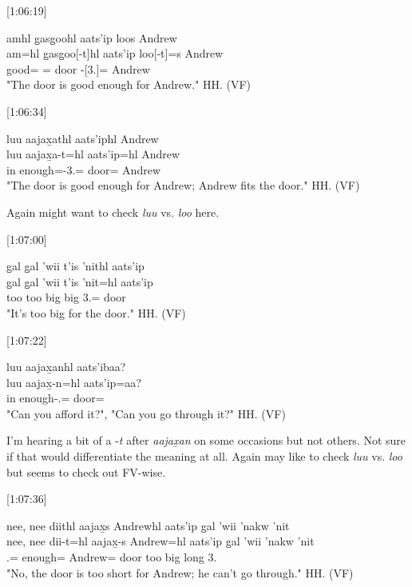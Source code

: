 [1:06:19]
\begin{exe}
    \ex \glll
    amhl g̱asg̱oohl aats'ip loos Andrew \\
    am=hl g̱asg̱oo[-t]hl aats'ip loo[-t]=s Andrew \\
    good=\Cn{} \Mass[-3.\Ii]=\Cn{} door \Obl-[3.\Ii]=\Pn{} Andrew \\
    \glt "The door is good enough for Andrew." \hfill HH.\ElicitationDate{} (VF)
\end{exe}

[1:06:34]
\begin{exe}
    \ex \glll
    luu aajax̱athl aats'iphl Andrew \\
    luu aajax̱a-t=hl aats'ip=hl Andrew  \\
    in enough=-3.\Ii=\Cn{} door=\Cn{} Andrew \\
    \glt "The door is good enough for Andrew; Andrew fits the door." \hfill HH.\ElicitationDate{} (VF)
\end{exe}

Again might want to check \textit{luu} vs. \textit{loo} here.

[1:07:00]
\begin{exe}
    \ex \glll
    g̱al g̱al 'wii t'is 'nithl aats'ip \\
    g̱al g̱al 'wii t'is 'nit=hl aats'ip \\
    too too big big 3.\Iii=\Cn{} door \\
    \glt "It's too big for the door." \hfill HH.\ElicitationDate{} (VF)
\end{exe}

[1:07:22]
\begin{exe}
    \ex \glll
    luu aajax̱anhl aats'ibaa? \\
    luu aajax̱-n=hl aats'ip=aa? \\
    in enough-\Ssg.\Ii=\Cn{} door=\Q \\
    \glt "Can you afford it?", "Can you go through it?" \hfill HH.\ElicitationDate{} (VF)
\end{exe}

I'm hearing a bit of a -\textit{t} after \textit{aajax̱an} on some occasions but not others. Not sure if that would differentiate the meaning at all. Again may like to check \textit{luu} vs. \textit{loo} but seems to check out FV-wise. 

[1:07:36]
\begin{exe}
    \ex \glll
    nee, nee diithl aajax̱s Andrewhl aats'ip g̱al 'wii 'nakw 'nit \\
    nee, nee dii-t=hl aajax̱-s Andrew=hl aats'ip g̱al 'wii 'nakw 'nit \\
    \Neg{} \Neg{} .\Ii=\Cn{} enough=\Pn{} Andrew=\Cn{} door too big long 3.\Iii \\
    \glt "No, the door is too short for Andrew; he can't go through." \hfill HH.\ElicitationDate{} (VF)
\end{exe}

